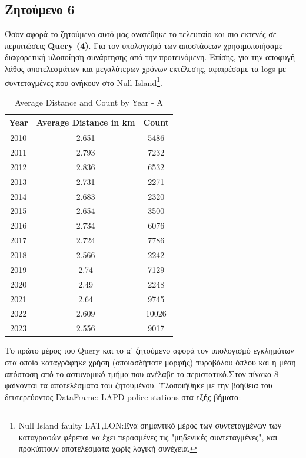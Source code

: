 \documentclass{article}
\begin{document}
\subsection{Ζητούμενο 6}
\label{subsec:Z6}
Όσον αφορά το ζητούμενο αυτό μας ανατέθηκε το τελευταίο και πιο εκτενές σε περιπτώσεις  \textbf{Query (4)}. Για τον υπολογισμό των αποστάσεων χρησιμοποιήσαμε διαφορετική υλοποίηση συνάρτησης από την προτεινόμενη. Επίσης, για την αποφυγή λάθος αποτελεσμάτων και μεγαλύτερων χρόνων εκτέλεσης, αφαιρέσαμε τα  logs  με συντεταγμένες που ανήκουν στο  Null Island\footnote{Null Island faulty LAT,LON:Ένα σημαντικό μέρος των συντεταγμένων των καταγραφών φέρεται να έχει περασμένες τις "μηδενικές συντεταγμένες", και προκύπτουν αποτελέσματα χωρίς λογική συνέχεια.}.\\
\begin{table}[h]
\centering
\begin{tabular}{|c|c|c|}
\hline
Year & Average Distance in km & Count \\ \hline
2010 & 2.651 & 5486 \\ \hline
2011 & 2.793 & 7232 \\ \hline
2012 & 2.836 & 6532 \\ \hline
2013 & 2.731 & 2271 \\ \hline
2014 & 2.683 & 2320 \\ \hline
2015 & 2.654 & 3500 \\ \hline
2016 & 2.734 & 6076 \\ \hline
2017 & 2.724 & 7786 \\ \hline
2018 & 2.566 & 2242 \\ \hline
2019 & 2.74  & 7129 \\ \hline
2020 & 2.49  & 2248 \\ \hline
2021 & 2.64  & 9745 \\ \hline
2022 & 2.609 & 10026 \\ \hline
2023 & 2.556 & 9017 \\ \hline
\end{tabular}
\caption{Average Distance and Count by Year - A}
\label{table:average_distance_counta}
\end{table}
\clearpage
{}
Το πρώτο μέρος του  Query  και το α' ζητούμενο αφορά τον υπολογισμό εγκλημάτων στα οποία καταγράφηκε χρήση (οποιασδήποτε μορφής) πυροβόλου όπλου και η μέση απόσταση από το αστυνομικό τμήμα που ανέλαβε το περιστατικό.Στον πίνακα 8 φαίνονται τα αποτελέσματα του ζητουμένου. Υλοποιήθηκε με την βοήθεια του δευτερεύοντος  DataFrame: LAPD police stations  στα εξής βήματα:
\end{document}
